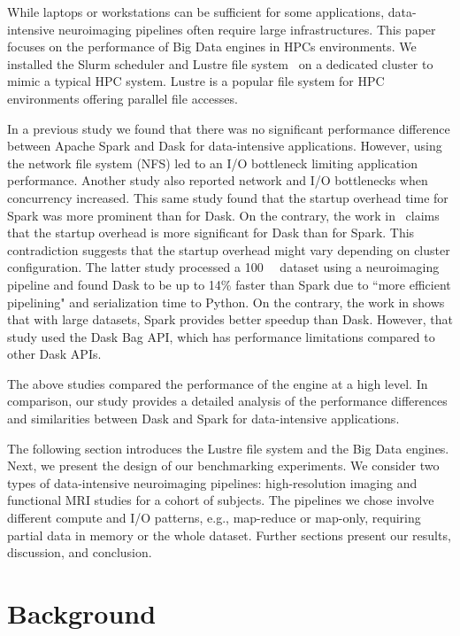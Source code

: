 \documentclass[conference]{IEEEtran}
\begin{document}
While laptops or workstations can be sufficient for some applications, data-intensive neuroimaging pipelines often require large infrastructures.
This paper focuses on the performance of Big Data engines in HPCs environments.
We installed the Slurm scheduler and Lustre file system~\cite{braam2019lustre} on a dedicated cluster to mimic a typical HPC system.
Lustre is a popular file system for HPC environments offering parallel file accesses.

In a previous study\cite{8943502} we found that there was no significant performance difference between Apache Spark and Dask for data-intensive applications.
However, using the network file system (NFS) led to an I/O bottleneck limiting application performance.
Another study \cite{8588652} also reported network and I/O bottlenecks when concurrency increased.
This same study found that the startup overhead time for Spark was more prominent than for Dask.
On the contrary, the work in~\cite{Mehta:17} claims that the startup overhead is more significant for Dask than for Spark.
This contradiction suggests that the startup overhead might vary depending on cluster configuration.
The latter study processed a \SI{100}{\giga\byte} dataset using a neuroimaging pipeline and found Dask to be up to 14\% faster than Spark due to ``more efficient pipelining" and serialization time to Python.
On the contrary, the work in \cite{10.1145/3225058.3225128} shows that with large datasets, Spark provides better speedup than Dask.
However, that study used the Dask Bag API, which has performance limitations compared to other Dask APIs.

The above studies compared the performance of the engine at a high level.
In comparison, our study provides a detailed analysis of the performance differences and similarities between Dask and Spark for data-intensive applications.

The following section introduces the Lustre file system and the Big Data engines.
Next, we present the design of our benchmarking experiments.
We consider two types of data-intensive neuroimaging pipelines: high-resolution imaging and functional MRI studies for a cohort of subjects.
The pipelines we chose involve different compute and I/O patterns, e.g., map-reduce or map-only, requiring partial data in memory or the whole dataset.
Further sections present our results, discussion, and conclusion.


\section{Background}
\end{document}
